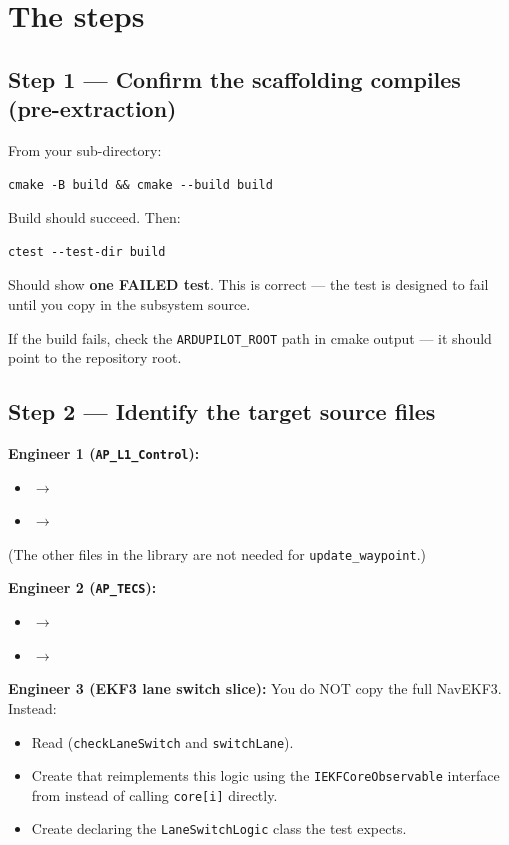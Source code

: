 \documentclass[a4paper,11pt,twoside]{article}
\begin{document}
\section*{The steps}

\subsection*{Step 1 --- Confirm the scaffolding compiles (pre-extraction)}
From your sub-directory:
\begin{Verbatim}[frame=single,fontsize=\small]
cmake -B build && cmake --build build
\end{Verbatim}
Build should succeed. Then:
\begin{Verbatim}[frame=single,fontsize=\small]
ctest --test-dir build
\end{Verbatim}
Should show \textbf{one FAILED test}. This is correct --- the test is designed to fail until you copy in the subsystem source.

If the build fails, check the \texttt{ARDUPILOT\_ROOT} path in cmake output --- it should point to the repository root.

\subsection*{Step 2 --- Identify the target source files}

\textbf{Engineer 1 (\texttt{AP\_L1\_Control}):}
\begin{itemize}
  \item {} $\rightarrow$ 
  \item {} $\rightarrow$ 
\end{itemize}
(The other files in the library are not needed for \texttt{update\_waypoint}.)

\textbf{Engineer 2 (\texttt{AP\_TECS}):}
\begin{itemize}
  \item {} $\rightarrow$ 
  \item {} $\rightarrow$ 
\end{itemize}

\textbf{Engineer 3 (EKF3 lane switch slice):}
You do NOT copy the full NavEKF3. Instead:
\begin{itemize}
  \item Read  (\texttt{checkLaneSwitch} and \texttt{switchLane}).
  \item Create  that reimplements this logic using the \texttt{IEKFCoreObservable} interface from  instead of calling \texttt{core[i]} directly.
  \item Create  declaring the \texttt{LaneSwitchLogic} class the test expects.
\end{itemize}
\end{document}
